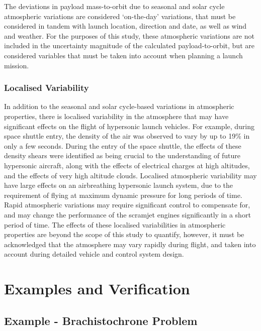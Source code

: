 The deviations in payload mass-to-orbit due to seasonal and solar cycle atmospheric variations are considered `on-the-day' variations, that must be considered in tandem with launch location, direction and date, as well as wind and weather. For the purposes of this study, these atmospheric variations are not included in the uncertainty magnitude of the calculated payload-to-orbit, but are considered variables that must be taken into account when planning a launch mission. 

\subsection{Localised Variability}

In addition to the seasonal and solar cycle-based variations in atmospheric properties, there is localised variability in the atmosphere that may have significant effects on the flight of hypersonic launch vehicles. For example, during space shuttle entry, the density of the air was observed to vary by up to 19\% in only a few seconds\cite{Hale2002}. During the entry of the space shuttle, the effects of these density shears were identified as being crucial to the understanding of future hypersonic aircraft, along with the effects of electrical charges at high altitudes, and the effects of very high altitude clouds. Localised atmospheric variability may have large effects on an airbreathing hypersonic launch system, due to the requirement of flying at maximum dynamic pressure for long periods of time. Rapid atmospheric variations may require significant control to compensate for, and may change the performance of the scramjet engines significantly in a short period of time. The effects of these localised variabilities in atmospheric properties are beyond the scope of this study to quantify, however, it must be acknowledged that the atmosphere may vary rapidly during flight, and taken into account during detailed vehicle and control system design. 
	




	


\chapter{Examples and Verification}

\section{Example - Brachistochrone Problem}

